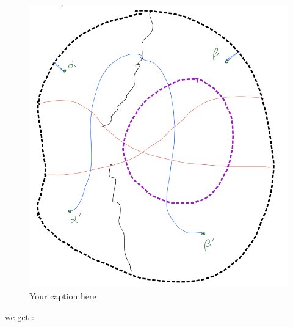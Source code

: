 \begin{figure}[H] %
    \centering
    \includegraphics[width=\linewidth]{diagrams/definition10/6.png} %
    \caption{Your caption here}
    \label{fig:your-label}
\end{figure}

we get :

